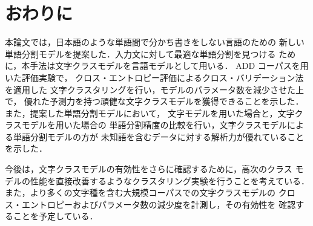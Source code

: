 \section{おわりに}

本論文では，日本語のような単語間で分かち書きをしない言語のための
新しい単語分割モデルを提案した．入力文に対して最適な単語分割を見つける
ために，本手法は文字クラスモデルを言語モデルとして用いる．
ADD コーパスを用いた評価実験で，
クロス・エントロピー評価によるクロス・バリデーション法を適用した
文字クラスタリングを行い，モデルのパラメータ数を減少させた上で，
優れた予測力を持つ頑健な文字クラスモデルを獲得できることを示した．
また，提案した単語分割モデルにおいて，
文字モデルを用いた場合と，文字クラスモデルを用いた場合の
単語分割精度の比較を行い，文字クラスモデルによる単語分割モデルの方が
未知語を含むデータに対する解析力が優れていることを示した．

今後は，文字クラスモデルの有効性をさらに確認するために，高次のクラス
モデルの性能を直接改善するようなクラスタリング実験を行うことを考えている．
また，より多くの文字種を含む大規模コーパスでの文字クラスモデルの
クロス・エントロピーおよびパラメータ数の減少度を計測し，その有効性を
確認することを予定している．





\begin{biography}


\end{biography}



